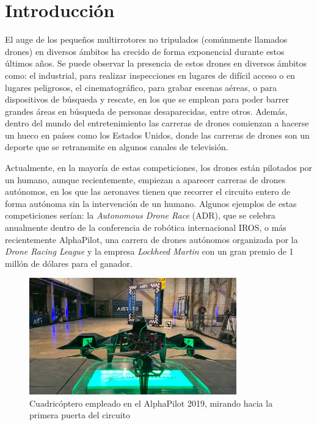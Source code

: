 \chapter{Introducción}


El auge de los pequeños multirrotores no tripulados (comúnmente llamados drones) en diversos ámbitos ha crecido de forma exponencial durante estos últimos años. Se puede observar la presencia de estos drones en diversos ámbitos como: el industrial, para realizar inspecciones en lugares de difícil acceso o en lugares peligrosos, el cinematográfico, para grabar escenas aéreas, o para dispositivos de búsqueda y rescate, en los que se emplean para poder barrer grandes áreas en búsqueda de personas desaparecidas, entre otros. Además, dentro del mundo del entretenimiento las carreras de drones comienzan a hacerse un hueco en países como los Estados Unidos, donde las carreras de drones son un deporte que se retransmite en algunos canales de televisión. 

Actualmente, en la mayoría de estas competiciones, los drones están pilotados por un humano, aunque recientemente, empiezan a aparecer carreras de drones autónomos, en los que las aeronaves tienen que recorrer el circuito entero de forma autónoma sin la intervención de un humano. Algunos ejemplos de estas competiciones serían: la \textit{Autonomous Drone Race} (ADR), que se celebra anualmente dentro de la conferencia de robótica internacional  IROS, o más recientemente AlphaPilot, una carrera de drones autónomos organizada por la \textit{Drone Racing League} y la empresa \textit{Lockheed Martin} con un gran premio de 1 millón de dólares para el ganador.

\begin{figure}[htb!]
	\centering
	\includegraphics[width=0.80\textwidth]{imagenes/foehnAlphaPilot}
	\caption{Cuadricóptero empleado en el AlphaPilot 2019, mirando hacia la primera puerta del circuito \cite{foehn2020alphapilot}}
	\label{}
\end{figure}


